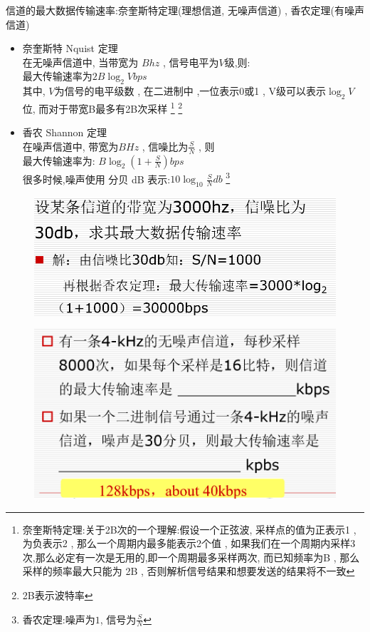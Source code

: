 \documentclass[UTF8,a4paper]{ctexart}
\begin{document}
  信道的最大数据传输速率:奈奎斯特定理(理想信道, 无噪声信道) , 香农定理(有噪声信道)
  \begin{itemize}
    \item 奈奎斯特 Nquist 定理\\
    在无噪声信道中, 当带宽为 $B hz$ , 信号电平为$V$级,则:\\
    最大传输速率为$2B \log_2 V bps$\\
    其中, $V$为信号的电平级数 , 在二进制中 ,一位表示0或1 , V级可以表示$\log_2 V$位,
    而对于带宽B最多有2B次采样
    \footnote{奈奎斯特定理:关于2B次的一个理解:假设一个正弦波, 采样点的值为正表示1 , 为负表示2 , 那么一个周期内最多能表示2个值 , 如果我们在一个周期内采样3次,那么必定有一次是无用的,即一个周期最多采样两次, 而已知频率为B , 那么采样的频率最大只能为 2B , 否则解析信号结果和想要发送的结果将不一致}
    \footnote{2B表示波特率}
    \item 香农 Shannon 定理\\
    在噪声信道中, 带宽为$B Hz$ , 信噪比为$\frac{S}{N}$ , 则 \\
    最大传输速率为: $B\log_2(1 + \frac{S}{N}) bps$\\
    很多时候,噪声使用 分贝 dB 表示:$10 \log_{10} \frac{S}{N} db$
    \footnote{香农定理:噪声为$1$, 信号为$\frac{S}{N}$}
  \end{itemize}

  \begin{figure}[H]
    \centering
    \includegraphics[scale = 0.3]{assets/jisuanjiwangluo_d4de4.png}
  \end{figure}

  \begin{figure}[H]
    \centering
    \includegraphics[scale = 0.3]{assets/jisuanjiwangluo_e6df3.png}
  \end{figure}
\end{document}
